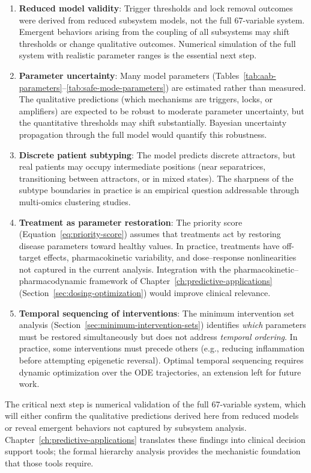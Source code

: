 \begin{enumerate}
    \item \textbf{Reduced model validity}: Trigger thresholds and lock removal outcomes were derived from reduced subsystem models, not the full 67-variable system. Emergent behaviors arising from the coupling of all subsystems may shift thresholds or change qualitative outcomes. Numerical simulation of the full system with realistic parameter ranges is the essential next step.

    \item \textbf{Parameter uncertainty}: Many model parameters (Tables~\ref{tab:aab-parameters}--\ref{tab:safe-mode-parameters}) are estimated rather than measured. The qualitative predictions (which mechanisms are triggers, locks, or amplifiers) are expected to be robust to moderate parameter uncertainty, but the quantitative thresholds may shift substantially. Bayesian uncertainty propagation through the full model would quantify this robustness.

    \item \textbf{Discrete patient subtyping}: The model predicts discrete attractors, but real patients may occupy intermediate positions (near separatrices, transitioning between attractors, or in mixed states). The sharpness of the subtype boundaries in practice is an empirical question addressable through multi-omics clustering studies.

    \item \textbf{Treatment as parameter restoration}: The priority score (Equation~\ref{eq:priority-score}) assumes that treatments act by restoring disease parameters toward healthy values. In practice, treatments have off-target effects, pharmacokinetic variability, and dose--response nonlinearities not captured in the current analysis. Integration with the pharmacokinetic--pharmacodynamic framework of Chapter~\ref{ch:predictive-applications} (Section~\ref{sec:dosing-optimization}) would improve clinical relevance.

    \item \textbf{Temporal sequencing of interventions}: The minimum intervention set analysis (Section~\ref{sec:minimum-intervention-sets}) identifies \emph{which} parameters must be restored simultaneously but does not address \emph{temporal ordering}. In practice, some interventions must precede others (e.g., reducing inflammation before attempting epigenetic reversal). Optimal temporal sequencing requires dynamic optimization over the ODE trajectories, an extension left for future work.
\end{enumerate}

The critical next step is numerical validation of the full 67-variable system, which will either confirm the qualitative predictions derived here from reduced models or reveal emergent behaviors not captured by subsystem analysis. Chapter~\ref{ch:predictive-applications} translates these findings into clinical decision support tools; the formal hierarchy analysis provides the mechanistic foundation that those tools require.
